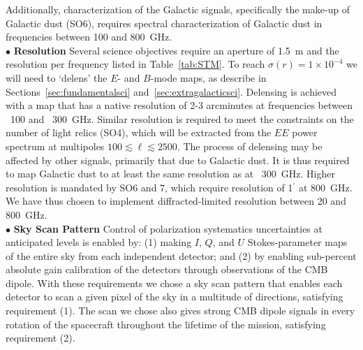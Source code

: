\documentclass[PICOReport.tex]{subfiles}
\begin{document}
Additionally, characterization of the Galactic signals, specifically the make-up of Galactic dust (SO6), requires spectral characterization 
of Galactic dust in frequencies between 100 and 800~GHz. \\ 
%
$\bullet$ {\bf Resolution} \hspace{0.1in} 
Several science objectives require an aperture of 1.5~m and the resolution per frequency listed in Table~\ref{tab:STM}. To reach $\sigma(r) = 1\times10^{-4}$ we will need to `delens' the $E$- and $B$-mode maps, as describe in Sections~\ref{sec:fundamentalsci} and~\ref{sec:extragalacticsci}. Delensing is achieved with a map that has a native resolution of 2-3 arcminutes at frequencies between ~100 and ~300~GHz. Similar resolution is required to meet the constraints on the number of light relics (SO4), which will be extracted from the $EE$ power spectrum at multipoles $100 \lesssim \ell \lesssim 2500$.  The process of delensing may be affected by other signals, primarily that due to Galactic dust. It is thus required to map Galactic dust to at least the same resolution as at ~300~GHz. Higher resolution is mandated by SO6 and 7, which require resolution of 1$^\prime$ at 800~GHz.  We have thus chosen to implement diffracted-limited resolution between 20 and 800~GHz. \\
%
$\bullet$ {\bf Sky Scan Pattern} \hspace{0.1in} 
Control of polarization systematics uncertainties at anticipated levels is enabled by: (1) making $I$, $Q$, and $U$ Stokes-parameter maps of the entire sky from each independent detector; and (2) by enabling sub-percent absolute gain calibration of the detectors through observations of the CMB dipole.  With these requirements we chose a sky scan pattern that enables each detector to scan a given pixel of the sky in a multitude of directions, satisfying requirement (1). The scan we chose also gives strong CMB dipole signals in every rotation of the spacecraft throughout the lifetime of the mission, satisfying requirement (2). 

 
\end{document}
